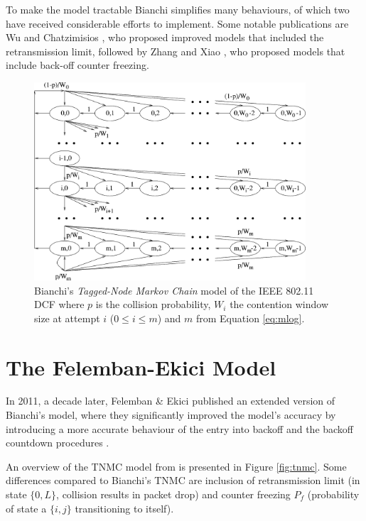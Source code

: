 To make the model tractable Bianchi simplifies many behaviours, of which two
have received considerable efforts to implement. Some notable publications
are Wu \cite{1019305} and Chatzimisios \cite{1258379}, who proposed improved
models that included the retransmission limit, followed by Zhang
\cite{article} and Xiao \cite{1512111}, who proposed models that include
back-off counter freezing.

\begin{figure}
\center
\includegraphics[width=0.9\textwidth]{images/bianchi-model.png}
\caption{Bianchi's \emph{Tagged-Node Markov Chain} model of the IEEE 802.11 DCF where $p$ is the collision probability, $W_i$ the contention window size at attempt $i$ ($0 \leq i \leq m$) and $m$ from Equation \ref{eq:mlog}.}
\label{fig:btnmc}
\end{figure}

\section{The Felemban-Ekici Model}

In 2011, a decade later, Felemban \& Ekici published an extended version of
Bianchi's model, where they significantly improved the model's accuracy by
introducing a more accurate behaviour of the entry into backoff and the
backoff countdown procedures \cite{felemban}.

An overview of the TNMC model from \cite{felemban} is presented in Figure
\ref{fig:tnmc}. Some differences compared to Bianchi's TNMC are inclusion of
retransmission limit (in state $\{0,L\}$, collision results in packet drop)
and counter freezing $P_f$ (probability of state a $\{i,j\}$ transitioning to
itself).

